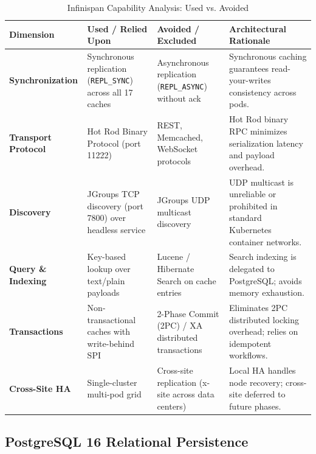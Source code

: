 \begin{table}[htbp]
\centering
\scriptsize
\begin{tabularx}{\textwidth}{P{3.0cm} P{3.8cm} P{3.8cm} Y}
\toprule
\textbf{Dimension} & \textbf{Used / Relied Upon} & \textbf{Avoided / Excluded} & \textbf{Architectural Rationale} \\
\midrule
\textbf{Synchronization} & Synchronous replication (\nolinkurl{REPL_SYNC}) across all 17 caches & Asynchronous replication (\nolinkurl{REPL_ASYNC}) without ack & Synchronous caching guarantees read-your-writes consistency across pods. \\
\addlinespace
\textbf{Transport Protocol} & Hot Rod Binary Protocol (port 11222) & REST, Memcached, WebSocket protocols & Hot Rod binary RPC minimizes serialization latency and payload overhead. \\
\addlinespace
\textbf{Discovery} & JGroups TCP discovery (port 7800) over headless service & JGroups UDP multicast discovery & UDP multicast is unreliable or prohibited in standard Kubernetes container networks. \\
\addlinespace
\textbf{Query \& Indexing} & Key-based lookup over text/plain payloads & Lucene / Hibernate Search on cache entries & Search indexing is delegated to PostgreSQL; avoids memory exhaustion. \\
\addlinespace
\textbf{Transactions} & Non-transactional caches with write-behind SPI & 2-Phase Commit (2PC) / XA distributed transactions & Eliminates 2PC distributed locking overhead; relies on idempotent workflows. \\
\addlinespace
\textbf{Cross-Site HA} & Single-cluster multi-pod grid & Cross-site replication (x-site across data centers) & Local HA handles node recovery; cross-site deferred to future phases. \\
\bottomrule
\end{tabularx}
\caption{Infinispan Capability Analysis: Used vs. Avoided}
\label{tab:infinispan_used_vs_avoided}
\end{table}

\subsection{PostgreSQL 16 Relational Persistence}

